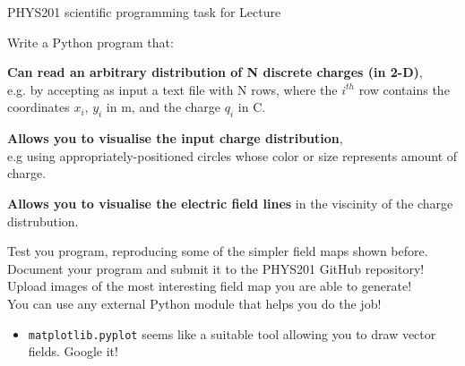 %
%

{
\programmingslide

%
%
%

\begin{frame}{PHYS201 scientific programming task for Lecture \thislecture}

{\small

Write a Python program that:
\begin{itemize}
{\scriptsize
  \item {\bf Can read an arbitrary distribution of N discrete charges (in 2-D)},\\
        e.g. by accepting as input a text file with N rows, where the $i^{th}$
        row contains the coordinates $x_i$, $y_i$ in m, and the charge $q_i$ in C.
  \item {\bf Allows you to visualise the input charge distribution},\\
        e.g using appropriately-positioned circles whose color or size represents amount of charge.
  \item {\bf Allows you to visualise the electric field lines}
        in the viscinity of the charge distrubution.\\
}
\end{itemize}

\vspace{0.2cm}
Test you program, reproducing some of the simpler field maps shown before.\\

\vspace{0.2cm}
Document your program and submit it to the PHYS201 GitHub repository!\\

\vspace{0.2cm}
Upload images of the most interesting field map you are able to generate!\\

\vspace{0.2cm}
You can use any external Python module that helps you do the job!\\
\begin{itemize}
  \item {\tt \color{red}matplotlib.pyplot} seems like a suitable tool allowing you to draw vector fields. Google it!
\end{itemize}
}
\end{frame}


} %



